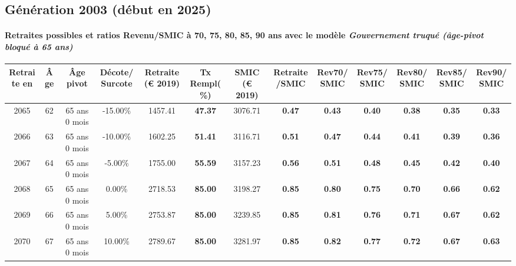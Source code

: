 \newpage 
 
\subsection{Génération 2003 (début en 2025)} 

\paragraph{Retraites possibles et ratios Revenu/SMIC à 70, 75, 80, 85, 90 ans avec le modèle \emph{Gouvernement truqué (âge-pivot bloqué à 65 ans)}}  
 
{ \scriptsize \begin{center} 
\begin{tabular}[htb]{|c|c||c|c||c|c||c||c|c|c|c|c|c|} 
\hline 
 Retraite en &  Âge &  Âge pivot &  Décote/Surcote &  Retraite (\euro{} 2019) &  Tx Rempl(\%) &  SMIC (\euro{} 2019) &  Retraite/SMIC &  Rev70/SMIC &  Rev75/SMIC &  Rev80/SMIC &  Rev85/SMIC &  Rev90/SMIC \\ 
\hline \hline 
 2065 &  62 &  65 ans 0 mois &  -15.00\% &  1457.41 &  {\bf 47.37} &  3076.71 &  {\bf {\color{red} 0.47}} &  {\bf {\color{red} 0.43}} &  {\bf {\color{red} 0.40}} &  {\bf {\color{red} 0.38}} &  {\bf {\color{red} 0.35}} &  {\bf {\color{red} 0.33}} \\ 
\hline 
 2066 &  63 &  65 ans 0 mois &  -10.00\% &  1602.25 &  {\bf 51.41} &  3116.71 &  {\bf {\color{red} 0.51}} &  {\bf {\color{red} 0.47}} &  {\bf {\color{red} 0.44}} &  {\bf {\color{red} 0.41}} &  {\bf {\color{red} 0.39}} &  {\bf {\color{red} 0.36}} \\ 
\hline 
 2067 &  64 &  65 ans 0 mois &  -5.00\% &  1755.00 &  {\bf 55.59} &  3157.23 &  {\bf {\color{red} 0.56}} &  {\bf {\color{red} 0.51}} &  {\bf {\color{red} 0.48}} &  {\bf {\color{red} 0.45}} &  {\bf {\color{red} 0.42}} &  {\bf {\color{red} 0.40}} \\ 
\hline 
 2068 &  65 &  65 ans 0 mois &  0.00\% &  2718.53 &  {\bf 85.00} &  3198.27 &  {\bf {\color{red} 0.85}} &  {\bf {\color{red} 0.80}} &  {\bf {\color{red} 0.75}} &  {\bf {\color{red} 0.70}} &  {\bf {\color{red} 0.66}} &  {\bf {\color{red} 0.62}} \\ 
\hline 
 2069 &  66 &  65 ans 0 mois &  5.00\% &  2753.87 &  {\bf 85.00} &  3239.85 &  {\bf {\color{red} 0.85}} &  {\bf {\color{red} 0.81}} &  {\bf {\color{red} 0.76}} &  {\bf {\color{red} 0.71}} &  {\bf {\color{red} 0.67}} &  {\bf {\color{red} 0.62}} \\ 
\hline 
 2070 &  67 &  65 ans 0 mois &  10.00\% &  2789.67 &  {\bf 85.00} &  3281.97 &  {\bf {\color{red} 0.85}} &  {\bf {\color{red} 0.82}} &  {\bf {\color{red} 0.77}} &  {\bf {\color{red} 0.72}} &  {\bf {\color{red} 0.67}} &  {\bf {\color{red} 0.63}} \\ 
\hline 
\hline 
\end{tabular} 
\end{center} } 
